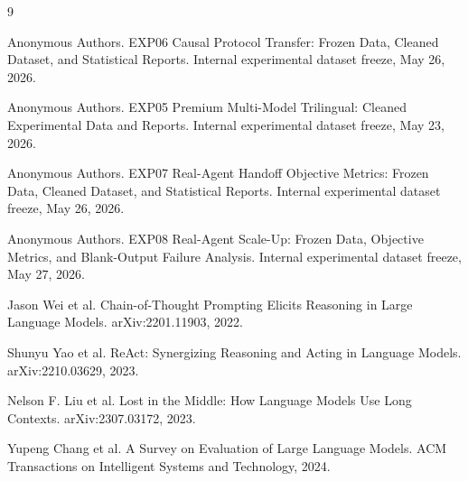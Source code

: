 \documentclass[11pt]{article}
\begin{document}
\begin{thebibliography}{9}

Anonymous Authors.
\newblock EXP06 Causal Protocol Transfer: Frozen Data, Cleaned Dataset, and Statistical Reports.
\newblock Internal experimental dataset freeze, May 26, 2026.

Anonymous Authors.
\newblock EXP05 Premium Multi-Model Trilingual: Cleaned Experimental Data and Reports.
\newblock Internal experimental dataset freeze, May 23, 2026.

Anonymous Authors.
\newblock EXP07 Real-Agent Handoff Objective Metrics: Frozen Data, Cleaned Dataset, and Statistical Reports.
\newblock Internal experimental dataset freeze, May 26, 2026.

Anonymous Authors.
\newblock EXP08 Real-Agent Scale-Up: Frozen Data, Objective Metrics, and Blank-Output Failure Analysis.
\newblock Internal experimental dataset freeze, May 27, 2026.

Jason Wei et al.
\newblock Chain-of-Thought Prompting Elicits Reasoning in Large Language Models.
\newblock arXiv:2201.11903, 2022.

Shunyu Yao et al.
\newblock ReAct: Synergizing Reasoning and Acting in Language Models.
\newblock arXiv:2210.03629, 2023.

Nelson F. Liu et al.
\newblock Lost in the Middle: How Language Models Use Long Contexts.
\newblock arXiv:2307.03172, 2023.

Yupeng Chang et al.
\newblock A Survey on Evaluation of Large Language Models.
\newblock ACM Transactions on Intelligent Systems and Technology, 2024.

\end{thebibliography}
\end{document}
